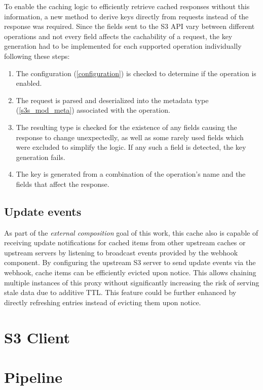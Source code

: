 To enable the caching logic to efficiently retrieve cached responses without this information, a new method to derive keys directly from requests instead of the response was required. Since the fields sent to the S3 API vary between different operations and not every field affects the cachability of a request, the key generation had to be implemented for each supported operation individually following these steps:
\begin{enumerate}
	\item The configuration (\ref{configuration}) is checked to determine if the operation is enabled.
	\item The request is parsed and deserialized into the metadata type (\ref{s3s_mod_meta}) associated with the operation.
	\item The resulting type is checked for the existence of any fields causing the response to change unexpectedly, as well as some rarely used fields which were excluded to simplify the logic. If any such a field is detected, the key generation fails.
	\item The key is generated from a combination of the operation's name and the fields that affect the response.
\end{enumerate}

\subsection{Update events}

As part of the \textit{external composition} goal of this work, this cache also is capable of receiving update notifications for cached items from other upstream caches or upstream servers by listening to broadcast events provided by the webhook component. By configuring the upstream S3 server to send update events via the webhook, cache items can be efficiently evicted upon notice. This allows chaining multiple instances of this proxy without significantly increasing the risk of serving stale data due to additive TTL.
This feature could be further enhanced by directly refreshing entries instead of evicting them upon notice.

\section{S3 Client}

\section{Pipeline}

